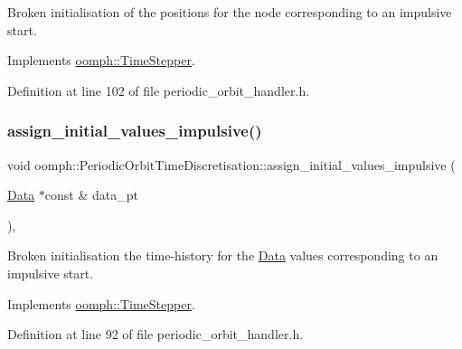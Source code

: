 Broken initialisation of the positions for the node corresponding to an impulsive start. 



Implements \hyperlink{classoomph_1_1TimeStepper_ab66972f0eaf3ba34645793e23e46afd5}{oomph\+::\+Time\+Stepper}.



Definition at line 102 of file periodic\+\_\+orbit\+\_\+handler.\+h.

\mbox{\label{classoomph_1_1PeriodicOrbitTimeDiscretisation_a45c5cd901ddf52fb1566665a2e161497}} 
\subsubsection{\texorpdfstring{assign\+\_\+initial\+\_\+values\+\_\+impulsive()}{assign\_initial\_values\_impulsive()}}
{\footnotesize\ttfamily void oomph\+::\+Periodic\+Orbit\+Time\+Discretisation\+::assign\+\_\+initial\+\_\+values\+\_\+impulsive (\begin{DoxyParamCaption}\item[{\hyperlink{classoomph_1_1Data}{Data} $\ast$const \&}]{data\+\_\+pt }\end{DoxyParamCaption})\hspace{0.3cm}{\ttfamily [inline]}, {\ttfamily [virtual]}}



Broken initialisation the time-\/history for the \hyperlink{classoomph_1_1Data}{Data} values corresponding to an impulsive start. 



Implements \hyperlink{classoomph_1_1TimeStepper_a7e894df13c88c96dd8eced2700228225}{oomph\+::\+Time\+Stepper}.



Definition at line 92 of file periodic\+\_\+orbit\+\_\+handler.\+h.

\mbox{\label{classoomph_1_1PeriodicOrbitTimeDiscretisation_ac26b0ab91fc9ec95dad7c207d960216a}} 
